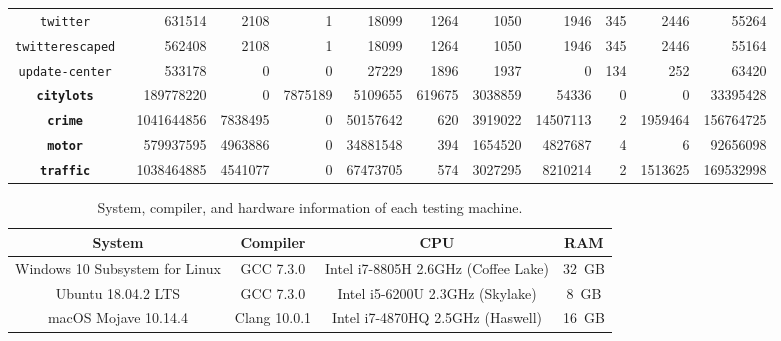 \documentclass[11pt]{article}
\begin{document}
\begin{table}[]
{\begin{tabular}{crrrrrrrrrr}
        \tt twitter             &     631514 &    2108 &       1 &    18099 &   1264 &    1050 &     1946 &  345 &    2446 &     55264 \\
        \tt twitterescaped      &     562408 &    2108 &       1 &    18099 &   1264 &    1050 &     1946 &  345 &    2446 &     55164 \\
        \tt update-center       &     533178 &       0 &       0 &    27229 &   1896 &    1937 &        0 &  134 &     252 &     63420 \\
    \cmidrule{1-11}
        \tt\textbf{citylots}    &  189778220 &       0 & 7875189 &  5109655 & 619675 & 3038859 &    54336 &    0 &       0 &  33395428 \\
        \tt\textbf{crime}       & 1041644856 & 7838495 &       0 & 50157642 &    620 & 3919022 & 14507113 &    2 & 1959464 & 156764725 \\
        \tt\textbf{motor}       &  579937595 & 4963886 &       0 & 34881548 &    394 & 1654520 &  4827687 &    4 &       6 &  92656098 \\
        \tt\textbf{traffic}     & 1038464885 & 4541077 &       0 & 67473705 &    574 & 3027295 &  8210214 &    2 & 1513625 & 169532998 \\
    \bottomrule
    \end{tabular}
    }
    \label{tab:datasets}
\end{table}

\begin{table}
    \centering\small
    \caption{System, compiler, and hardware information of each testing machine.}
    \label{tab:machines}
    \begin{tabular}{cccc}
    \toprule
         \bf System & \bf Compiler & \bf CPU & \bf RAM \\
         \midrule
         Windows 10 Subsystem for Linux & GCC 7.3.0 & Intel i7-8805H 2.6GHz (Coffee Lake) & \SI{32}{GB} \\
         Ubuntu 18.04.2 LTS & GCC 7.3.0 & Intel i5-6200U 2.3GHz (Skylake) & \SI{8}{GB} \\
         macOS Mojave 10.14.4 & Clang 10.0.1 & Intel i7-4870HQ 2.5GHz (Haswell) & \SI{16}{GB} \\
    \bottomrule
    \end{tabular}
\end{table}
\end{document}
